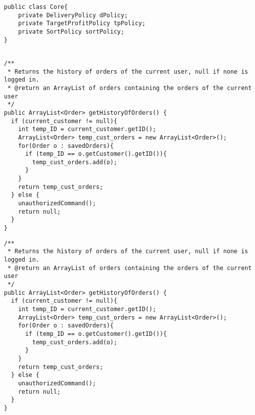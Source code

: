 \begin{lstlisting}[caption=Aggregation applied to the \Core~and its policies.,
  label=lst:aggregationCore]
public class Core{
    private DeliveryPolicy dPolicy;
    private TargetProfitPolicy tpPolicy;
    private SortPolicy sortPolicy;
}
  
\end{lstlisting}


\begin{lstlisting}[caption=Application of the \texttt{current\_customer}
  concept to \texttt{getHistoryOfOrders}.,
  label=lst:historyOfOrders]
/**
 * Returns the history of orders of the current user, null if none is logged in.
 * @return an ArrayList of orders containing the orders of the current user
 */
public ArrayList<Order> getHistoryOfOrders() {
  if (current_customer != null){
    int temp_ID = current_customer.getID();
    ArrayList<Order> temp_cust_orders = new ArrayList<Order>();
    for(Order o : savedOrders){
      if (temp_ID == o.getCustomer().getID()){
        temp_cust_orders.add(o);
      }
    }
    return temp_cust_orders;
  } else {
    unauthorizedCommand();
    return null;
  }
}
\end{lstlisting}

\begin{lstlisting}[caption=Application of the \texttt{current\_customer}
  concept to \texttt{getHistoryOfOrders}.,
  label=lst:historyOfOrders]
/**
 * Returns the history of orders of the current user, null if none is logged in.
 * @return an ArrayList of orders containing the orders of the current user
 */
public ArrayList<Order> getHistoryOfOrders() {
  if (current_customer != null){
    int temp_ID = current_customer.getID();
    ArrayList<Order> temp_cust_orders = new ArrayList<Order>();
    for(Order o : savedOrders){
      if (temp_ID == o.getCustomer().getID()){
        temp_cust_orders.add(o);
      }
    }
    return temp_cust_orders;
  } else {
    unauthorizedCommand();
    return null;
  }
}
\end{lstlisting}

